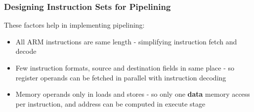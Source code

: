 \begin{frame}\frametitle{Designing Instruction Sets for Pipelining}

These factors help in implementing pipelining:
\begin{itemize}
\item All ARM instructions are same length - simplifying instruction
fetch and decode
\item Few instruction formats, source and destination fields in same place - so
register operands can be fetched in parallel with instruction decoding
\item Memory operands only in loads and stores - so only one \textbf{data }memory
access per instruction, and address can be computed in execute stage

  

\end{itemize}

\end{frame}



